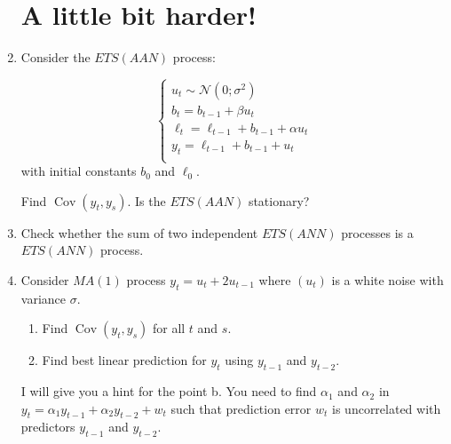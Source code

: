 \documentclass[12pt]{article}
\DeclareMathOperator{\Cov}{Cov}
\def \cN{\mathcal{N}}
\begin{document}
\begin{enumerate}
\section*{A little bit harder!}


\item Consider the $ETS(AAN)$ process:
    
\[
\begin{cases}
	u_t \sim \cN(0; \sigma^2) \\
	b_t = b_{t-1} + \beta u_t \\
	\ell_t = \ell_{t-1} + b_{t-1} + \alpha u_t \\
	y_t = \ell_{t-1} + b_{t-1} + u_t \\
\end{cases}    
\]
with initial constants $b_0$ and $\ell_0$. 

Find $\Cov(y_t, y_s)$. Is the $ETS(AAN)$ stationary?


\item Check whether the sum of two independent $ETS(ANN)$ processes is a $ETS(ANN)$ process.

\item Consider $MA(1)$ process $y_t = u_t + 2u_{t-1}$ where $(u_t)$ is a white noise with variance $\sigma$.


\begin{enumerate}
	\item Find $\Cov(y_t, y_s)$ for all $t$ and $s$.
	\item Find best linear prediction for $y_t$ using $y_{t-1}$ and $y_{t-2}$. 

\end{enumerate}

I will give you a hint for the point b. You need to find $\alpha_1$ and $\alpha_2$ in 
$y_t = \alpha_1 y_{t-1} + \alpha_2 y_{t-2} + w_t$ such that prediction error $w_t$ is uncorrelated with predictors $y_{t-1}$ and $y_{t-2}$.
\end{enumerate}
\end{document}
